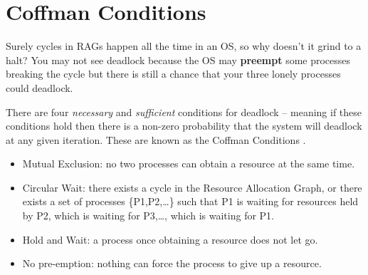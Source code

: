 \section{Coffman Conditions}

Surely cycles in RAGs happen all the time in an OS, so why doesn't it grind to a halt?
You may not see deadlock because the OS may \textbf{preempt} some processes breaking the cycle but there is still a chance that your three lonely processes could deadlock.

There are four \emph{necessary} and \emph{sufficient} conditions for deadlock -- meaning if these conditions hold then there is a non-zero probability that the system will deadlock at any given iteration.
These are known as the \gls{Coffman Conditions} \cite{coffman1971system}.

\begin{itemize}
\tightlist
\item
  \gls{Mutual Exclusion}: no two processes can obtain a resource at the same time.
\item
  \gls{Circular Wait}: there exists a cycle in the Resource Allocation Graph, or there exists a set of processes \{P1,P2,\ldots{}\} such that P1 is waiting for resources held by P2, which is waiting for P3,\ldots{}, which is waiting for P1.
\item
  \gls{Hold and Wait}: a process once obtaining a resource does not let go.
\item
  No \gls{pre-emption}: nothing can force the process to give up a resource.
\end{itemize}

